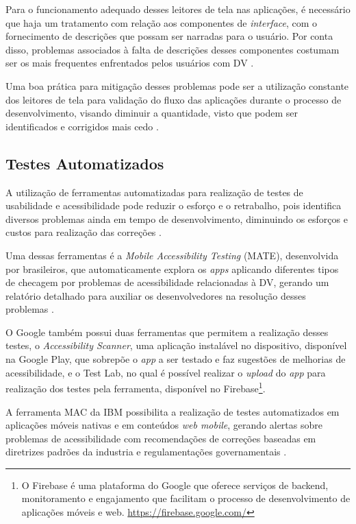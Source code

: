 Para o funcionamento adequado desses leitores de tela nas aplicações, é necessário que haja um tratamento
com relação aos componentes de \emph{interface}, com o fornecimento de descrições que possam ser narradas para o usuário. Por conta disso,
problemas associados à falta de descrições desses componentes costumam ser os mais frequentes enfrentados pelos usuários com DV
\cite{Vendome201941,Christoph2020,Shera2021285}.

Uma boa prática para mitigação desses problemas pode ser a utilização constante dos leitores de tela para validação do fluxo das aplicações durante
o processo de desenvolvimento, visando diminuir a quantidade, visto que podem ser identificados e corrigidos mais cedo \cite{Tomlinson2016377}.

\subsection{Testes Automatizados}

A utilização de ferramentas automatizadas para realização de testes de usabilidade e acessibilidade pode reduzir o esforço
e o retrabalho, pois identifica diversos problemas ainda em tempo de desenvolvimento, diminuindo os esforços e custos para
realização das correções \cite{Christoph2020}.

Uma dessas ferramentas é a \emph{Mobile Accessibility Testing} (MATE), desenvolvida por brasileiros, que automaticamente explora os \emph{apps}
aplicando diferentes tipos de checagem por problemas de acessibilidade relacionadas à DV, gerando um relatório detalhado para auxiliar
os desenvolvedores na resolução desses problemas \cite{Eler2018AutomatedAT}.

O Google também possui duas ferramentas que permitem a realização desses testes, o \emph{Accessibility Scanner}, uma aplicação instalável no
dispositivo, disponível na Google Play,
que sobrepõe o \emph{app} a ser testado e faz sugestões de melhorias de acessibilidade, e o Test Lab, no qual é possível realizar o \emph{upload}
do \emph{app} para realização dos testes pela ferramenta, disponível no Firebase\footnote{O Firebase é uma plataforma do Google
que oferece serviços de backend, monitoramento e engajamento que facilitam o processo de desenvolvimento
de aplicações móveis e web. \url{https://firebase.google.com/}}.

A ferramenta MAC da IBM possibilita a realização de testes automatizados em aplicações
móveis nativas e em conteúdos \emph{web mobile}, gerando alertas sobre problemas de acessibilidade com recomendações de
correções baseadas em diretrizes padrões da industria e regulamentações governamentais \cite{patil2016enhanced,Yan2019}.

